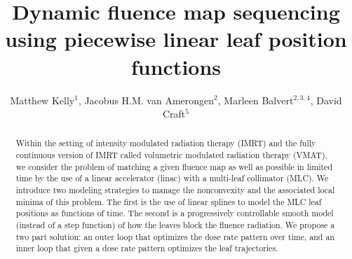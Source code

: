 \documentclass{iopart}
\begin{document}
\title[Dynamic MLC sequencing with splines ]{Dynamic fluence map sequencing using piecewise linear leaf position functions}
\author{Matthew Kelly$^1$, Jacobus H.M. van Amerongen$^2$, Marleen Balvert$^{2,3,4}$, David Craft$^5$}
\address{$^1$ Department of Mechanical Engineering, Tufts University, Medford MA 02155, USA}
\address{$^2$ Department of Econometrics and Operations Research/Center for Economic Research (CentER), Tilburg University, PO Box 90153, 5000 LE Tilburg, The Netherlands}
\address{$^3$ Centrum Wiskunde \& Informatica (CWI), P.O. Box 94079, 1090 GB Amsterdam, The Netherlands}
\address{$^4$ Department of Biology, University of Utrecht, Padualaan 8, 3584 CH Utrecht, The Netherlands}
\address{$^5$ Department of Radiation Oncology, Massachusetts General Hospital and Harvard Medical School, Boston, MA 02114, USA}

\begin{abstract}
  Within the setting of intensity modulated radiation therapy (IMRT) and the fully continuous version of IMRT called volumetric modulated radiation therapy (VMAT), we consider the problem of matching a given fluence map as well as possible in limited time by the use of a linear accelerator (linac) with a multi-leaf collimator (MLC). We introduce two modeling strategies to manage the nonconvexity and the associated local minima of this problem. The first is the use of linear splines to model the MLC leaf positions as functions of time. The second is a progressively controllable smooth model (instead of a step function) of how the leaves block the fluence radiation. We propose a two part solution: an outer loop that optimizes the dose rate pattern over time, and an inner loop that given a dose rate pattern optimizes the leaf trajectories.
\end{abstract}
\end{document}
